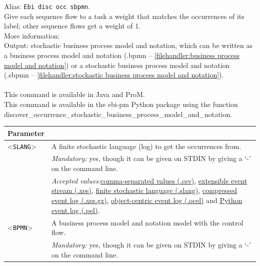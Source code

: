 {Alias: \texttt{Ebi disc occ sbpmn}.\\
Give each sequence flow to a task a weight that matches the occurrences of its label; other sequence flows get a weight of 1.\\
More information: ~\cite{DBLP:conf/icpm/BurkeLW20}~\\
\noindent Output: stochastic business process model and notation, which can be written as a business process model and notation (.bpmn -- \cref{filehandler:business process model and notation}) or a stochastic business process model and notation (.sbpmn -- \cref{filehandler:stochastic business process model and notation}).\\
\\This command is available in Java and ProM.
\\This command is available in the ebi-pm Python package using the function discover\_occurrence\_stochastic\_business\_process\_model\_and\_notation.
\begin{tabularx}{\linewidth}{lX}
\toprule
Parameter \\\midrule
<\texttt{SLANG}>&A finite stochastic language (log) to get the occurrences from.\\
&\textit{Mandatory:} \quad yes, though it can be given on STDIN by giving a `-' on the command line.\\
&\textit{Accepted values:}\quad \hyperref[filehandler:comma-separated values]{comma-separated values (.csv)}, \hyperref[filehandler:extensible event stream]{extensible event stream (.xes)}, \hyperref[filehandler:finite stochastic language]{finite stochastic language (.slang)}, \hyperref[filehandler:compressed event log]{compressed event log (.xes.gz)}, \hyperref[filehandler:object-centric event log]{object-centric event log (.ocel)} and \hyperref[filehandler:Python event log]{Python event log (.pel)}.\\
<\texttt{BPMN}>&A business process model and notation model with the control flow.\\
&\textit{Mandatory:} \quad yes, though it can be given on STDIN by giving a `-' on the command line.\\

\end{tabularx}}
